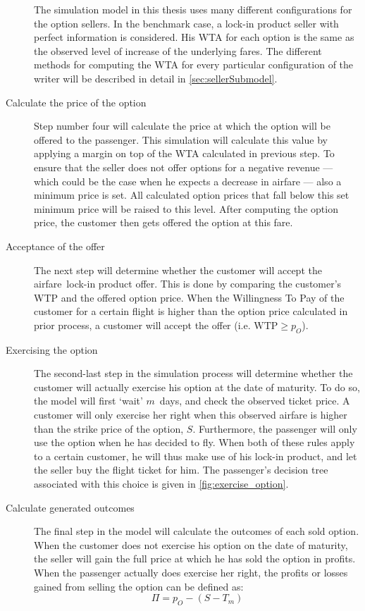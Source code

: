 \begin{description}
The simulation model in this thesis uses many different configurations for the option sellers. In the benchmark case, a lock-in product seller with perfect information is considered. His WTA for each option is the same as the observed level of increase of the underlying fares. The different methods for computing the WTA for every particular configuration of the writer will be described in detail in \autoref{sec:sellerSubmodel}.

\item[Calculate the price of the option] Step number four will calculate the price at which the option will be offered to the passenger. This simulation will calculate this value by applying a margin on top of the WTA calculated in previous step. To ensure that the seller does not offer options for a negative revenue --- which could be the case when he expects a decrease in airfare --- also a minimum price is set. All calculated option prices that fall below this set minimum price will be raised to this level. After computing the option price, the customer then gets offered the option at this fare.

\item[Acceptance of the offer] The next step will determine whether the customer will accept the airfare~lock-in product offer. This is done by comparing the customer's WTP and the offered option price. When the Willingness To Pay of the customer for a certain flight is higher than the option price calculated in prior process, a customer will accept the offer (i.e. $\text{WTP} \ge p_O$).

\item[Exercising the option] The second-last step in the simulation process will determine whether the customer will actually exercise his option at the date of maturity. To do so, the model will first `wait' $m$~days, and check the observed ticket price. A customer will only exercise her right when this observed airfare is higher than the strike price of the option, $S$. Furthermore, the passenger will only use the option when he has decided to fly. When both of these rules apply to a certain customer, he will thus make use of his lock-in product, and let the seller buy the flight ticket for him. The passenger's decision tree associated with this choice is given in \autoref{fig:exercise_option}.


\item[Calculate generated outcomes] The final step in the model will calculate the outcomes of each sold option. When the customer does not exercise his option on the date of maturity, the seller will gain the full price at which he has sold the option in profits. When the passenger actually does exercise her right, the profits or losses gained from selling the option can be defined as:
$$ \Pi = p_O - (S - T_m) $$
\end{description}

